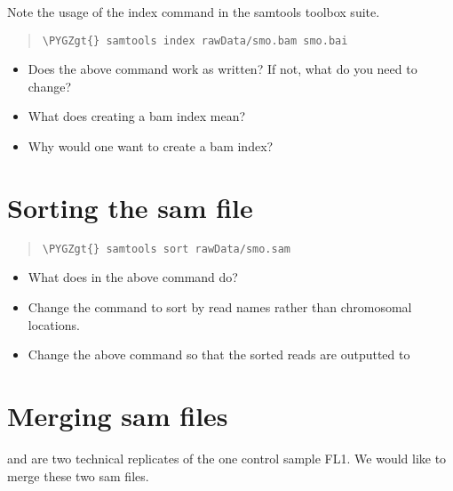 \documentclass[a4paper,11pt,english]{sphinxmanual}
\def\PYGZgt{\char`\>}
\begin{document}
Note the usage of the index command in the samtools toolbox suite.
\begin{quote}

\begin{Verbatim}[frame=single, rulecolor=\color{lightgray}, fontfamily=courier, commandchars=\\\{\}]
\PYGZgt{} samtools index rawData/smo.bam smo.bai
\end{Verbatim}
\end{quote}
\begin{itemize}
\item {} 
Does the above command work as written? If not, what do you need to change?

\item {} 
What does creating a bam index mean?

\item {} 
Why would one want to create a bam index?

\end{itemize}


\section{Sorting the sam file}
\label{exercises/STEP3_viewManipulateAlignmentData_samtools:sorting-the-sam-file}\begin{quote}

\begin{Verbatim}[frame=single, rulecolor=\color{lightgray}, fontfamily=courier, commandchars=\\\{\}]
\PYGZgt{} samtools sort rawData/smo.sam
\end{Verbatim}
\end{quote}
\begin{itemize}
\item {} 
What does  in the above command do?

\item {} 
Change the command to sort by read names rather than chromosomal locations.

\item {} 
Change the above command so that the sorted reads are outputted to 

\end{itemize}


\section{Merging sam files}
\label{exercises/STEP3_viewManipulateAlignmentData_samtools:merging-sam-files}
 and  are two technical replicates of the one control sample FL1. We would like to merge these two sam files.
\end{document}
